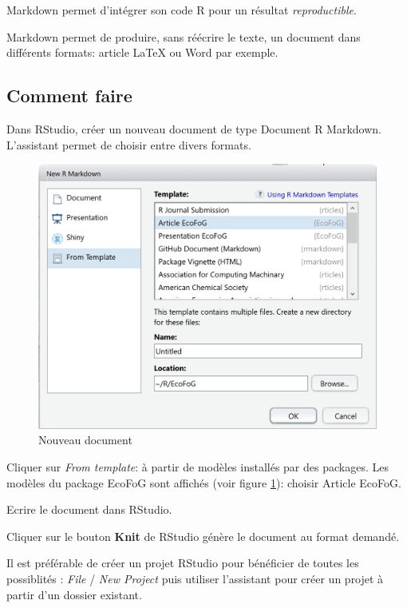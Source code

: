 \documentclass[fleqn,10pt]{ArtEcoFoG} %
\makeatletter
\def\maxwidth{\ifdim\Gin@nat@width>\linewidth\linewidth\else\Gin@nat@width\fi}
\makeatother
\begin{document}
Markdown permet d'intégrer son code R pour un résultat \emph{reproductible}.

Markdown permet de produire, sans réécrire le texte, un document dans différents formats: article LaTeX ou Word par exemple.

\hypertarget{comment-faire}{%
\subsection{Comment faire}\label{comment-faire}}

Dans RStudio, créer un nouveau document de type Document R Markdown.
L'assistant permet de choisir entre divers formats.

\begin{figure}
\includegraphics[width=\maxwidth]{images/NouveauRMarkdown} \caption{Nouveau document}\label{fig:nouveau}
\end{figure}

Cliquer sur \emph{From template}: à partir de modèles installés par des packages.
Les modèles du package EcoFoG sont affichés (voir figure \ref{fig:nouveau}): choisir Article EcoFoG.

Ecrire le document dans RStudio.

Cliquer sur le bouton \textbf{Knit} de RStudio génère le document au format demandé.

Il est préférable de créer un projet RStudio pour bénéficier de toutes les possiblités : \emph{File} / \emph{New Project} puis utiliser l'assistant pour créer un projet à partir d'un dossier existant.
\end{document}

